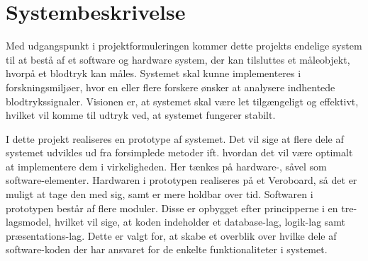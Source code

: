 \chapter{Systembeskrivelse}
Med udgangspunkt i projektformuleringen kommer dette projekts endelige system til at bestå af et software og hardware system, der kan tilsluttes et måleobjekt, hvorpå et blodtryk kan måles. Systemet skal kunne implementeres i forskningsmiljøer, hvor en eller flere forskere ønsker at analysere indhentede blodtrykssignaler. Visionen er, at systemet skal være let tilgængeligt og effektivt, hvilket vil komme til udtryk ved, at systemet fungerer stabilt.

I dette projekt realiseres en prototype af systemet. Det vil sige at flere dele af systemet udvikles ud fra forsimplede metoder ift. hvordan det vil være optimalt at implementere dem i virkeligheden. Her tænkes på hardware-, såvel som software-elementer. Hardwaren i prototypen realiseres på et Veroboard, så det er muligt at tage den med sig, samt er mere holdbar over tid. Softwaren i prototypen består af flere moduler. Disse er opbygget efter principperne i en tre-lagsmodel, hvilket vil sige, at koden indeholder et database-lag, logik-lag samt præsentations-lag. Dette er valgt for, at skabe et overblik over hvilke dele af software-koden der har ansvaret for de enkelte funktionaliteter i systemet.

